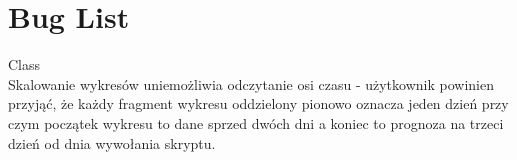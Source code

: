 \chapter{Bug List}
\hypertarget{bug}{}\label{bug}

\begin{DoxyRefList}
\item[Class \doxylink{class_weather_app}{Weather\+App} ]\hfill \\
\label{bug__bug000001}%
%
Skalowanie wykresów uniemożliwia odczytanie osi czasu -\/ użytkownik powinien przyjąć, że każdy fragment wykresu oddzielony pionowo oznacza jeden dzień przy czym początek wykresu to dane sprzed dwóch dni a koniec to prognoza na trzeci dzień od dnia wywołania skryptu. 
\end{DoxyRefList}